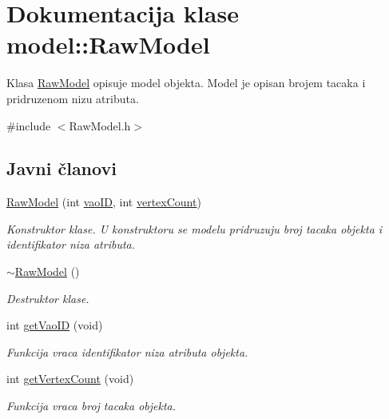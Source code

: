 \hypertarget{classmodel_1_1RawModel}{}\section{Dokumentacija klase model\+:\+:Raw\+Model}
\label{classmodel_1_1RawModel}


Klasa \hyperlink{classmodel_1_1RawModel}{Raw\+Model} opisuje model objekta. Model je opisan brojem tacaka i pridruzenom nizu atributa.  




{\ttfamily \#include $<$Raw\+Model.\+h$>$}

\subsection*{Javni članovi}
\begin{DoxyCompactItemize}
\item 
\hyperlink{classmodel_1_1RawModel_ab7054a4703b26233f6a366721ea48353}{Raw\+Model} (int \hyperlink{classmodel_1_1RawModel_a325b2b7e719afce688027efbf92e27b7}{vao\+ID}, int \hyperlink{classmodel_1_1RawModel_a76a976df29d34a1d0f7a7e8f42a4477c}{vertex\+Count})
\begin{DoxyCompactList}\small\item\em Konstruktor klase. U konstruktoru se modelu pridruzuju broj tacaka objekta i identifikator niza atributa. \end{DoxyCompactList}\item 
\hyperlink{classmodel_1_1RawModel_a44e687484478b0747abe25baa3533b71}{$\sim$\+Raw\+Model} ()
\begin{DoxyCompactList}\small\item\em Destruktor klase. \end{DoxyCompactList}\item 
int \hyperlink{classmodel_1_1RawModel_a8132ec85cbc5f5286534ed6d67ee69ad}{get\+Vao\+ID} (void)
\begin{DoxyCompactList}\small\item\em Funkcija vraca identifikator niza atributa objekta. \end{DoxyCompactList}\item 
int \hyperlink{classmodel_1_1RawModel_a2216788939e3b42e7de828607d4a911d}{get\+Vertex\+Count} (void)
\begin{DoxyCompactList}\small\item\em Funkcija vraca broj tacaka objekta. \end{DoxyCompactList}\end{DoxyCompactItemize}

